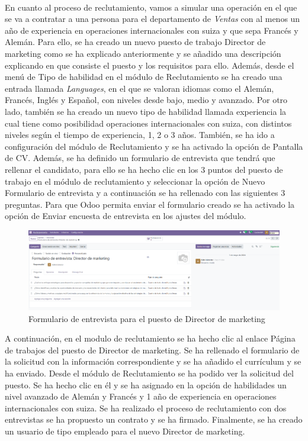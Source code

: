\paragraph{}
En cuanto al proceso de reclutamiento, vamos a simular una operación en el que se va a contratar a una persona para el departamento de \textit{Ventas} con al menos un año de experiencia en operaciones internacionales con suiza y que sepa Francés y Alemán. Para ello, se ha creado un nuevo puesto de trabajo Director de marketing como se ha explicado anteriormente y se añadido una descripción explicando en que consiste el puesto y los requisitos para ello. Además, desde el menú de Tipo de habilidad en el módulo de Reclutamiento se ha creado una entrada llamada \textit{Languages}, en el que se valoran idiomas como el Alemán, Francés, Inglés y Español, con niveles desde bajo, medio y avanzado. Por otro lado, también se ha creado un nuevo tipo de habilidad llamada experiencia la cual tiene como posibilidad operaciones internacionales con suiza, con distintos niveles según el tiempo de experiencia, 1, 2 o 3 años. También, se ha ido a configuración del módulo de Reclutamiento y se ha activado la opción de Pantalla de CV. Además, se ha definido un formulario de entrevista que tendrá que rellenar el candidato, para ello se ha hecho clic en los 3 puntos del puesto de trabajo en el módulo de reclutamiento y seleccionar la opción de Nuevo Formulario de entrevista y a continuación se ha rellenado con las siguientes 3 preguntas. Para que Odoo permita enviar el formulario creado se ha activado la opción de Enviar encuesta de entrevista en los ajustes del módulo.
\begin{figure}[h]
    \centering
    \includegraphics[width=1\linewidth]{fotosGestPers/image.png}
    \caption{Formulario de entrevista para el puesto de Director de marketing}
    \label{fig:enter-label}
\end{figure}
A continuación, en el modulo de reclutamiento se ha hecho clic al enlace Página de trabajos del puesto de Director de marketing. Se ha rellenado el formulario de la solicitud con la información correspondiente y se ha añadido el currículum y se ha enviado. Desde el módulo de Reclutamiento se ha podido ver la solicitud del puesto. Se ha hecho clic en él y se ha asignado en la opción de habilidades un nivel avanzado de Alemán y Francés y 1 año de experiencia en operaciones internacionales con suiza. Se ha realizado el proceso de reclutamiento con dos entrevistas se ha propuesto un contrato y se ha firmado. Finalmente, se ha creado un usuario de tipo empleado para el nuevo Director de marketing.
